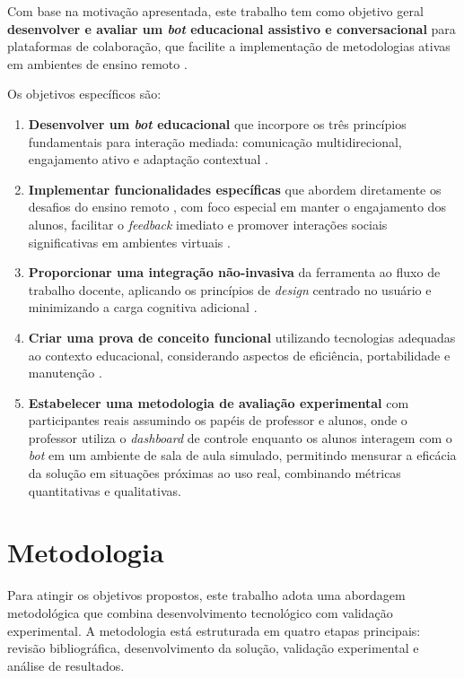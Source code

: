 Com base na motivação apresentada, este trabalho tem como objetivo geral
\textbf{desenvolver e avaliar um \textit{bot} educacional assistivo e
conversacional} para plataformas de colaboração, que facilite a implementação de
metodologias ativas em ambientes de ensino remoto \cite{prince2004,okonkwo2021}.

Os objetivos específicos são:

\begin{enumerate}
\item \textbf{Desenvolver um \textit{bot} educacional} que incorpore os três
princípios fundamentais para interação mediada: comunicação multidirecional, 
engajamento ativo e adaptação contextual \cite{seering2018}.
\item \textbf{Implementar funcionalidades específicas} que abordem diretamente
os desafios do ensino remoto \cite{fabiane2024}, com foco especial em manter o 
engajamento dos alunos, facilitar o \textit{feedback} imediato e promover 
interações sociais significativas em ambientes virtuais \cite{han2022}.
\item \textbf{Proporcionar uma integração não-invasiva} da ferramenta ao fluxo
de trabalho docente, aplicando os princípios de \textit{design} centrado no
usuário \cite{roy1987,norman2013} e minimizando a carga cognitiva adicional
\cite{sweller2011}.
\item \textbf{Criar uma prova de conceito funcional} utilizando tecnologias
adequadas ao contexto educacional, considerando aspectos de eficiência,
portabilidade e manutenção \cite{kernighan1988}.
\item \textbf{Estabelecer uma metodologia de avaliação experimental} com
participantes reais assumindo os papéis de professor e alunos, onde o professor
utiliza o \textit{dashboard} de controle \cite{verbert2013} enquanto os alunos 
interagem com o \textit{bot} em um ambiente de sala de aula simulado, permitindo
mensurar a eficácia da solução em situações próximas ao uso real, combinando 
métricas quantitativas e qualitativas.
\end{enumerate}

\section{Metodologia}
\label{sec:metodologia-intro}

Para atingir os objetivos propostos, este trabalho adota uma abordagem
metodológica que combina desenvolvimento tecnológico com validação experimental.
A metodologia está estruturada em quatro etapas principais: revisão
bibliográfica, desenvolvimento da solução, validação experimental e análise de
resultados.

